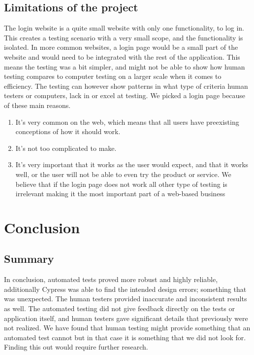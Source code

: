 \documentclass[journal,twocolumn]{IEEEtran}
\begin{document}
\subsection{Limitations of the project}
The login website is a quite small website with only one functionality, to log in. This creates a testing scenario with a very small scope, and the functionality is isolated. In more common websites, a login page would be a small part of the website and would need to be integrated with the rest of the application. This means the testing was a bit simpler, and might not be able to show how human testing compares to computer testing on a larger scale when it comes to efficiency. The testing can however show patterns in what type of criteria human testers or computers, lack in or excel at testing. We picked a login page because of these main reasons.

\begin{enumerate}
    \item It's very common on the web, which means that all users have preexisting conceptions of how it should work.
    \item It's not too complicated to make.
    \item It's very important that it works as the user would expect, and that it works well, or the user will not be able to even try the product or service. We believe that if the login page does not work all other type of testing is irrelevant making it the most important part of a web-based business
\end{enumerate}

\section{Conclusion}
\subsection{Summary}
In conclusion, automated tests proved more robust and highly reliable, additionally Cypress was able to find the intended design errors; something that was unexpected. The human testers provided inaccurate and inconsistent results as well. The automated testing did not give feedback directly on the tests or application itself, and human testers gave significant details that previously were not realized. We have found that human testing might provide something that an automated test cannot but in that case it is something that we did not look for. Finding this out would require further research.
\end{document}
